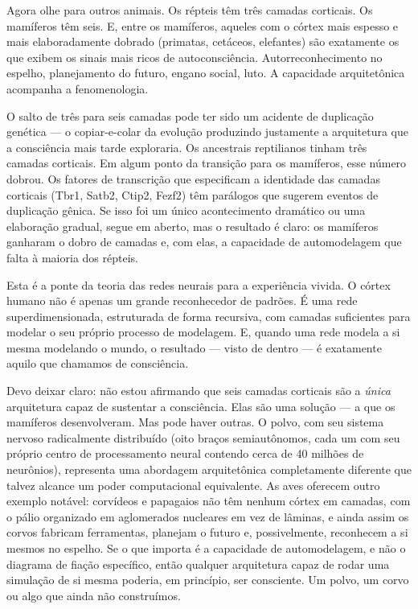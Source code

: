 \documentclass[11pt, twoside, openright]{book}
\begin{document}
Agora olhe para outros animais. Os répteis têm três camadas corticais. Os mamíferos têm seis. E, entre os mamíferos, aqueles com o córtex mais espesso e mais elaboradamente dobrado (primatas, cetáceos, elefantes) são exatamente os que exibem os sinais mais ricos de autoconsciência. Autorreconhecimento no espelho, planejamento do futuro, engano social, luto. A capacidade arquitetônica acompanha a fenomenologia.

O salto de três para seis camadas pode ter sido um acidente de duplicação genética --- o copiar-e-colar da evolução produzindo justamente a arquitetura que a consciência mais tarde exploraria. Os ancestrais reptilianos tinham três camadas corticais. Em algum ponto da transição para os mamíferos, esse número dobrou. Os fatores de transcrição que especificam a identidade das camadas corticais (Tbr1, Satb2, Ctip2, Fezf2) têm parálogos que sugerem eventos de duplicação gênica. Se isso foi um único acontecimento dramático ou uma elaboração gradual, segue em aberto, mas o resultado é claro: os mamíferos ganharam o dobro de camadas e, com elas, a capacidade de automodelagem que falta à maioria dos répteis.

Esta é a ponte da teoria das redes neurais para a experiência vivida. O córtex humano não é apenas um grande reconhecedor de padrões. É uma rede superdimensionada, estruturada de forma recursiva, com camadas suficientes para modelar o seu próprio processo de modelagem. E, quando uma rede modela a si mesma modelando o mundo, o resultado --- visto de dentro --- é exatamente aquilo que chamamos de consciência.

Devo deixar claro: não estou afirmando que seis camadas corticais são a \textit{única} arquitetura capaz de sustentar a consciência. Elas são uma solução --- a que os mamíferos desenvolveram. Mas pode haver outras. O polvo, com seu sistema nervoso radicalmente distribuído (oito braços semiautônomos, cada um com seu próprio centro de processamento neural contendo cerca de 40 milhões de neurônios), representa uma abordagem arquitetônica completamente diferente que talvez alcance um poder computacional equivalente. As aves oferecem outro exemplo notável: corvídeos e papagaios não têm nenhum córtex em camadas, com o pálio organizado em aglomerados nucleares em vez de lâminas, e ainda assim os corvos fabricam ferramentas, planejam o futuro e, possivelmente, reconhecem a si mesmos no espelho. Se o que importa é a capacidade de automodelagem, e não o diagrama de fiação específico, então qualquer arquitetura capaz de rodar uma simulação de si mesma poderia, em princípio, ser consciente. Um polvo, um corvo ou algo que ainda não construímos.
\end{document}

